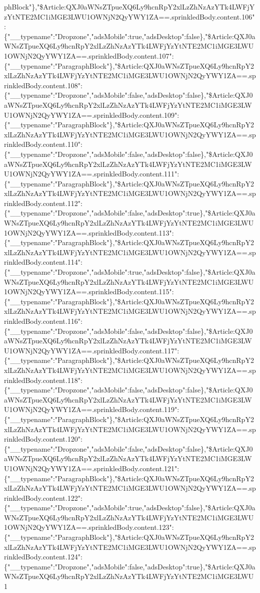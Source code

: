 phBlock"\},"\$Article:QXJ0aWNsZTpueXQ6Ly9hcnRpY2xlLzZhNzAzYTk4LWFjYzYtNTE2MC1iMGE3LWU1OWNjN2QyYWY1ZA==.sprinkledBody.content.106":\{"\_\_typename":"Dropzone","adsMobile":true,"adsDesktop":false\},"\$Article:QXJ0aWNsZTpueXQ6Ly9hcnRpY2xlLzZhNzAzYTk4LWFjYzYtNTE2MC1iMGE3LWU1OWNjN2QyYWY1ZA==.sprinkledBody.content.107":\{"\_\_typename":"ParagraphBlock"\},"\$Article:QXJ0aWNsZTpueXQ6Ly9hcnRpY2xlLzZhNzAzYTk4LWFjYzYtNTE2MC1iMGE3LWU1OWNjN2QyYWY1ZA==.sprinkledBody.content.108":\{"\_\_typename":"Dropzone","adsMobile":false,"adsDesktop":false\},"\$Article:QXJ0aWNsZTpueXQ6Ly9hcnRpY2xlLzZhNzAzYTk4LWFjYzYtNTE2MC1iMGE3LWU1OWNjN2QyYWY1ZA==.sprinkledBody.content.109":\{"\_\_typename":"ParagraphBlock"\},"\$Article:QXJ0aWNsZTpueXQ6Ly9hcnRpY2xlLzZhNzAzYTk4LWFjYzYtNTE2MC1iMGE3LWU1OWNjN2QyYWY1ZA==.sprinkledBody.content.110":\{"\_\_typename":"Dropzone","adsMobile":false,"adsDesktop":false\},"\$Article:QXJ0aWNsZTpueXQ6Ly9hcnRpY2xlLzZhNzAzYTk4LWFjYzYtNTE2MC1iMGE3LWU1OWNjN2QyYWY1ZA==.sprinkledBody.content.111":\{"\_\_typename":"ParagraphBlock"\},"\$Article:QXJ0aWNsZTpueXQ6Ly9hcnRpY2xlLzZhNzAzYTk4LWFjYzYtNTE2MC1iMGE3LWU1OWNjN2QyYWY1ZA==.sprinkledBody.content.112":\{"\_\_typename":"Dropzone","adsMobile":false,"adsDesktop":true\},"\$Article:QXJ0aWNsZTpueXQ6Ly9hcnRpY2xlLzZhNzAzYTk4LWFjYzYtNTE2MC1iMGE3LWU1OWNjN2QyYWY1ZA==.sprinkledBody.content.113":\{"\_\_typename":"ParagraphBlock"\},"\$Article:QXJ0aWNsZTpueXQ6Ly9hcnRpY2xlLzZhNzAzYTk4LWFjYzYtNTE2MC1iMGE3LWU1OWNjN2QyYWY1ZA==.sprinkledBody.content.114":\{"\_\_typename":"Dropzone","adsMobile":true,"adsDesktop":false\},"\$Article:QXJ0aWNsZTpueXQ6Ly9hcnRpY2xlLzZhNzAzYTk4LWFjYzYtNTE2MC1iMGE3LWU1OWNjN2QyYWY1ZA==.sprinkledBody.content.115":\{"\_\_typename":"ParagraphBlock"\},"\$Article:QXJ0aWNsZTpueXQ6Ly9hcnRpY2xlLzZhNzAzYTk4LWFjYzYtNTE2MC1iMGE3LWU1OWNjN2QyYWY1ZA==.sprinkledBody.content.116":\{"\_\_typename":"Dropzone","adsMobile":false,"adsDesktop":false\},"\$Article:QXJ0aWNsZTpueXQ6Ly9hcnRpY2xlLzZhNzAzYTk4LWFjYzYtNTE2MC1iMGE3LWU1OWNjN2QyYWY1ZA==.sprinkledBody.content.117":\{"\_\_typename":"ParagraphBlock"\},"\$Article:QXJ0aWNsZTpueXQ6Ly9hcnRpY2xlLzZhNzAzYTk4LWFjYzYtNTE2MC1iMGE3LWU1OWNjN2QyYWY1ZA==.sprinkledBody.content.118":\{"\_\_typename":"Dropzone","adsMobile":false,"adsDesktop":false\},"\$Article:QXJ0aWNsZTpueXQ6Ly9hcnRpY2xlLzZhNzAzYTk4LWFjYzYtNTE2MC1iMGE3LWU1OWNjN2QyYWY1ZA==.sprinkledBody.content.119":\{"\_\_typename":"ParagraphBlock"\},"\$Article:QXJ0aWNsZTpueXQ6Ly9hcnRpY2xlLzZhNzAzYTk4LWFjYzYtNTE2MC1iMGE3LWU1OWNjN2QyYWY1ZA==.sprinkledBody.content.120":\{"\_\_typename":"Dropzone","adsMobile":false,"adsDesktop":false\},"\$Article:QXJ0aWNsZTpueXQ6Ly9hcnRpY2xlLzZhNzAzYTk4LWFjYzYtNTE2MC1iMGE3LWU1OWNjN2QyYWY1ZA==.sprinkledBody.content.121":\{"\_\_typename":"ParagraphBlock"\},"\$Article:QXJ0aWNsZTpueXQ6Ly9hcnRpY2xlLzZhNzAzYTk4LWFjYzYtNTE2MC1iMGE3LWU1OWNjN2QyYWY1ZA==.sprinkledBody.content.122":\{"\_\_typename":"Dropzone","adsMobile":true,"adsDesktop":false\},"\$Article:QXJ0aWNsZTpueXQ6Ly9hcnRpY2xlLzZhNzAzYTk4LWFjYzYtNTE2MC1iMGE3LWU1OWNjN2QyYWY1ZA==.sprinkledBody.content.123":\{"\_\_typename":"ParagraphBlock"\},"\$Article:QXJ0aWNsZTpueXQ6Ly9hcnRpY2xlLzZhNzAzYTk4LWFjYzYtNTE2MC1iMGE3LWU1OWNjN2QyYWY1ZA==.sprinkledBody.content.124":\{"\_\_typename":"Dropzone","adsMobile":false,"adsDesktop":true\},"\$Article:QXJ0aWNsZTpueXQ6Ly9hcnRpY2xlLzZhNzAzYTk4LWFjYzYtNTE2MC1iMGE3LWU1